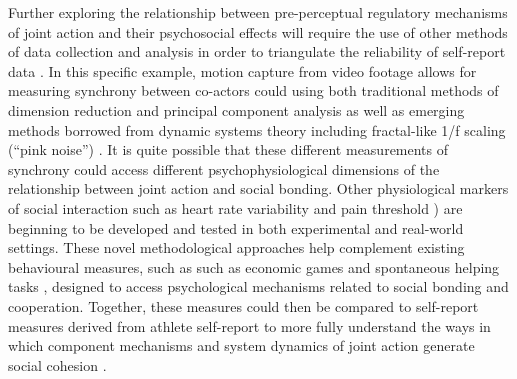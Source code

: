 Further exploring the relationship between pre-perceptual regulatory mechanisms of joint action and their psychosocial effects will require the use of other methods of data collection and analysis in order to triangulate the reliability of self-report data \citep{Newell2014}.  In this specific example, motion capture from video footage allows for measuring synchrony between co-actors could using both traditional methods of dimension reduction and principal component analysis \citep[see for example][]{Riley2011} as well as emerging methods borrowed from dynamic systems theory including fractal-like 1/f scaling (``pink noise'') \citep[see for example][]{Holden2013}. It is quite possible that these different measurements of synchrony could access different psychophysiological dimensions of the relationship between joint action and social bonding.  Other physiological markers of social interaction such as heart rate variability \citep{Konvalinka2011,Fischer2014a} and pain threshold \citep{Cohen2009,Tarr2015}) are beginning to be developed and tested in both experimental and real-world settings.
These novel methodological approaches help complement existing behavioural measures, such as such as economic games \citep{Xygalatas2013} and spontaneous helping tasks \citep{Kirschner2010}, designed to access psychological mechanisms related to social bonding and cooperation.
Together, these measures could then be compared to self-report measures derived from athlete self-report to more fully understand the ways in which component mechanisms and system dynamics of joint action generate social cohesion \citep{Marsh2009}.




